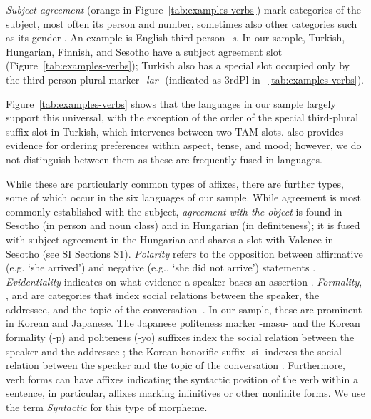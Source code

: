 \documentclass[11pt,letterpaper]{article}
\newcommand{\citep}{\parencite}
\newcommand{\citet}{\Textcite}
\newcounter{def}
\begin{document}
\textit{Subject agreement} (orange in Figure~\ref{tab:examples-verbs}) mark categories of the subject, most often its person and number, sometimes also other categories such as its gender \citep{corbett2003agreement}.
An example is English third-person \textit{-s}.
In our sample, Turkish, Hungarian, Finnish, and Sesotho have a subject agreement slot (Figure~\ref{tab:examples-verbs}); Turkish also has a special slot occupied only by the third-person plural marker \textit{-lar-} (indicated as 3rdPl in ~\ref{tab:examples-verbs}).



Figure~\ref{tab:examples-verbs} shows that the languages in our sample largely support this universal, with the exception of the order of the special third-plural suffix slot in Turkish, which intervenes between two TAM slots.
\citet{bybee-morphology-1985} also provides evidence for ordering preferences within aspect, tense, and mood; however, we do not distinguish between them as these are frequently fused in languages.


While these are particularly common types of affixes, there are further types, some of which occur in the six languages of our sample.
While agreement is most commonly established with the subject, \textit{agreement with the object} is found in Sesotho \citep{doke1967textbook} (in person and noun class) and in Hungarian \citep{rounds2001hungarian} (in definiteness); it is fused with subject agreement in the Hungarian and shares a slot with Valence in Sesotho (see SI Sections S1).
\textit{Polarity} refers to the opposition between affirmative (e.g. `she arrived') and negative  (e.g., `she did not arrive') statements \citep{wals-112}.
\textit{Evidentiality} indicates on what evidence a speaker bases an assertion \citep{aikhenvald2003evidentiality}.
\textit{Formality}, , and  are categories that index social relations between the speaker, the addressee, and the topic of the conversation~\citep{hasegawa2014japanese, yeon2010korean}.
In our sample, these are prominent in Korean and Japanese.
The Japanese politeness marker -masu- and the Korean formality (-p) and politeness (-yo) suffixes index the social relation between the speaker and the addressee \citep{hasegawa2014japanese, yeon2010korean}; the Korean honorific suffix -si- indexes the social relation between the speaker and the topic of the conversation \citep{yeon2010korean}.
Furthermore, verb forms can have affixes indicating the syntactic position of the verb within a sentence, in particular, affixes marking infinitives or other nonfinite forms.
We use the term \textit{Syntactic} for this type of morpheme.
\end{document}
